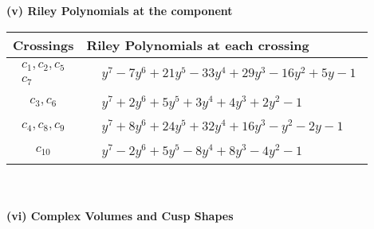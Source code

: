 \documentclass[1p]{elsarticle_modified}
\theoremstyle{definition}
\begin{document}
\newpage\renewcommand{\arraystretch}{1}
\flushleft \textbf{(v) Riley Polynomials at the component}\newline \\
\begin{tabular}{m{50pt}|m{274pt}}
Crossings & \hspace{64pt}Riley Polynomials at each crossing \\
\hline $$\begin{aligned}c_{1},c_{2},c_{5}\\c_{7}\end{aligned}$$&$\begin{aligned}
&y^7-7 y^6+21 y^5-33 y^4+29 y^3-16 y^2+5 y-1
\end{aligned}$\\
\hline $$\begin{aligned}c_{3},c_{6}\end{aligned}$$&$\begin{aligned}
&y^7+2 y^6+5 y^5+3 y^4+4 y^3+2 y^2-1
\end{aligned}$\\
\hline $$\begin{aligned}c_{4},c_{8},c_{9}\end{aligned}$$&$\begin{aligned}
&y^7+8 y^6+24 y^5+32 y^4+16 y^3- y^2-2 y-1
\end{aligned}$\\
\hline $$\begin{aligned}c_{10}\end{aligned}$$&$\begin{aligned}
&y^7-2 y^6+5 y^5-8 y^4+8 y^3-4 y^2-1
\end{aligned}$\\
\hline
\end{tabular}\\~\\
\newpage\flushleft \textbf{(vi) Complex Volumes and Cusp Shapes}
\end{document}

